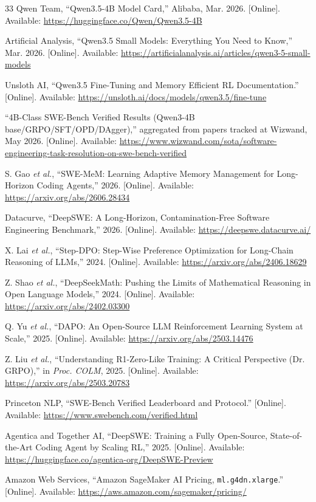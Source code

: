 \documentclass[conference]{IEEEtran}
\begin{document}
\begin{thebibliography}{33}
Qwen Team, ``Qwen3.5-4B Model Card,'' Alibaba, Mar. 2026. [Online]. Available: \url{https://huggingface.co/Qwen/Qwen3.5-4B}

Artificial Analysis, ``Qwen3.5 Small Models: Everything You Need to Know,'' Mar. 2026. [Online]. Available: \url{https://artificialanalysis.ai/articles/qwen3-5-small-models}

Unsloth AI, ``Qwen3.5 Fine-Tuning and Memory Efficient RL Documentation.'' [Online]. Available: \url{https://unsloth.ai/docs/models/qwen3.5/fine-tune}

``4B-Class SWE-Bench Verified Results (Qwen3-4B base/GRPO/SFT/OPD/DAgger),'' aggregated from papers tracked at Wizwand, May 2026. [Online]. Available: \url{https://www.wizwand.com/sota/software-engineering-task-resolution-on-swe-bench-verified}

S. Gao \emph{et al.}, ``SWE-MeM: Learning Adaptive Memory Management for Long-Horizon Coding Agents,'' 2026. [Online]. Available: \url{https://arxiv.org/abs/2606.28434}

Datacurve, ``DeepSWE: A Long-Horizon, Contamination-Free Software Engineering Benchmark,'' 2026. [Online]. Available: \url{https://deepswe.datacurve.ai/}

X. Lai \emph{et al.}, ``Step-DPO: Step-Wise Preference Optimization for Long-Chain Reasoning of LLMs,'' 2024. [Online]. Available: \url{https://arxiv.org/abs/2406.18629}

Z. Shao \emph{et al.}, ``DeepSeekMath: Pushing the Limits of Mathematical Reasoning in Open Language Models,'' 2024. [Online]. Available: \url{https://arxiv.org/abs/2402.03300}

Q. Yu \emph{et al.}, ``DAPO: An Open-Source LLM Reinforcement Learning System at Scale,'' 2025. [Online]. Available: \url{https://arxiv.org/abs/2503.14476}

Z. Liu \emph{et al.}, ``Understanding R1-Zero-Like Training: A Critical Perspective (Dr. GRPO),'' in \emph{Proc. COLM}, 2025. [Online]. Available: \url{https://arxiv.org/abs/2503.20783}

Princeton NLP, ``SWE-Bench Verified Leaderboard and Protocol.'' [Online]. Available: \url{https://www.swebench.com/verified.html}

Agentica and Together AI, ``DeepSWE: Training a Fully Open-Source, State-of-the-Art Coding Agent by Scaling RL,'' 2025. [Online]. Available: \url{https://huggingface.co/agentica-org/DeepSWE-Preview}

Amazon Web Services, ``Amazon SageMaker AI Pricing, \texttt{ml.g4dn.xlarge}.'' [Online]. Available: \url{https://aws.amazon.com/sagemaker/pricing/}

\end{thebibliography}
\end{document}
